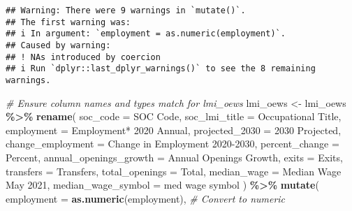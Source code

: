 \documentclass[
]{article}
\newenvironment{Shaded}{\begin{snugshade}}{\end{snugshade}}
\newcommand{\AttributeTok}[1]{\textcolor[rgb]{0.13,0.29,0.53}{#1}}
\newcommand{\CommentTok}[1]{\textcolor[rgb]{0.56,0.35,0.01}{\textit{#1}}}
\newcommand{\FunctionTok}[1]{\textcolor[rgb]{0.13,0.29,0.53}{\textbf{#1}}}
\newcommand{\NormalTok}[1]{#1}
\newcommand{\OtherTok}[1]{\textcolor[rgb]{0.56,0.35,0.01}{#1}}
\newcommand{\SpecialCharTok}[1]{\textcolor[rgb]{0.81,0.36,0.00}{\textbf{#1}}}
\newcommand{\StringTok}[1]{\textcolor[rgb]{0.31,0.60,0.02}{#1}}
\begin{document}
\begin{verbatim}
## Warning: There were 9 warnings in `mutate()`.
## The first warning was:
## i In argument: `employment = as.numeric(employment)`.
## Caused by warning:
## ! NAs introduced by coercion
## i Run `dplyr::last_dplyr_warnings()` to see the 8 remaining warnings.
\end{verbatim}

\begin{Shaded}
\begin{Highlighting}[]
\CommentTok{\# Ensure column names and types match for \textasciigrave{}lmi\_oews\textasciigrave{}}
\NormalTok{lmi\_oews }\OtherTok{\textless{}{-}}\NormalTok{ lmi\_oews }\SpecialCharTok{\%\textgreater{}\%}
  \FunctionTok{rename}\NormalTok{(}
    \AttributeTok{soc\_code =} \StringTok{\textasciigrave{}}\AttributeTok{SOC Code}\StringTok{\textasciigrave{}}\NormalTok{,}
    \AttributeTok{soc\_lmi\_title =} \StringTok{\textasciigrave{}}\AttributeTok{Occupational Title}\StringTok{\textasciigrave{}}\NormalTok{,}
    \AttributeTok{employment =} \StringTok{\textasciigrave{}}\AttributeTok{Employment* 2020 Annual}\StringTok{\textasciigrave{}}\NormalTok{,}
    \AttributeTok{projected\_2030 =} \StringTok{\textasciigrave{}}\AttributeTok{2030 Projected}\StringTok{\textasciigrave{}}\NormalTok{,}
    \AttributeTok{change\_employment =} \StringTok{\textasciigrave{}}\AttributeTok{Change in Employment 2020{-}2030}\StringTok{\textasciigrave{}}\NormalTok{,}
    \AttributeTok{percent\_change =} \StringTok{\textasciigrave{}}\AttributeTok{Percent}\StringTok{\textasciigrave{}}\NormalTok{,}
    \AttributeTok{annual\_openings\_growth =} \StringTok{\textasciigrave{}}\AttributeTok{Annual Openings Growth}\StringTok{\textasciigrave{}}\NormalTok{,}
    \AttributeTok{exits =} \StringTok{\textasciigrave{}}\AttributeTok{Exits}\StringTok{\textasciigrave{}}\NormalTok{,}
    \AttributeTok{transfers =} \StringTok{\textasciigrave{}}\AttributeTok{Transfers}\StringTok{\textasciigrave{}}\NormalTok{,}
    \AttributeTok{total\_openings =} \StringTok{\textasciigrave{}}\AttributeTok{Total}\StringTok{\textasciigrave{}}\NormalTok{,}
    \AttributeTok{median\_wage =} \StringTok{\textasciigrave{}}\AttributeTok{Median Wage May 2021}\StringTok{\textasciigrave{}}\NormalTok{,}
    \AttributeTok{median\_wage\_symbol =} \StringTok{\textasciigrave{}}\AttributeTok{med wage symbol}\StringTok{\textasciigrave{}}
\NormalTok{  ) }\SpecialCharTok{\%\textgreater{}\%} \FunctionTok{mutate}\NormalTok{(}
    \AttributeTok{employment =} \FunctionTok{as.numeric}\NormalTok{(employment),  }\CommentTok{\# Convert to numeric}

\end{Highlighting}
\end{Shaded}
\end{document}

